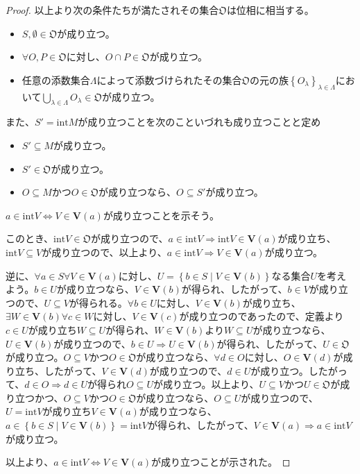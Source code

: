 \documentclass[dvipdfmx]{jsarticle}
\begin{document}
\begin{proof}
以上より次の条件たちが満たされその集合$\mathfrak{O}$は位相に相当する。
\begin{itemize}
\item
  $S,\emptyset \in \mathfrak{O}$が成り立つ。
\item
  $\forall O,P \in \mathfrak{O}$に対し、$O \cap P \in \mathfrak{O}$が成り立つ。
\item
  任意の添数集合$\varLambda$によって添数づけられたその集合$\mathfrak{O}$の元の族$\left\{ O_{\lambda} \right\}_{\lambda \in \varLambda}$において$\bigcup_{\lambda \in \varLambda} O_{\lambda}\in \mathfrak{O}$が成り立つ。
\end{itemize}\par
また、$S' = {\mathrm{int}}M$が成り立つことを次のこといづれも成り立つことと定め
\begin{itemize}
\item
  $S' \subseteq M$が成り立つ。
\item
  $S'\in \mathfrak{O}$が成り立つ。
\item
  $O \subseteq M$かつ$O \in \mathfrak{O}$が成り立つなら、$O \subseteq S'$が成り立つ。
\end{itemize}
$a \in {\mathrm{int}}V \Leftrightarrow V \in \mathbf{V}(a)$が成り立つことを示そう。\par
このとき、${\mathrm{int}}V\in \mathfrak{O}$が成り立つので、$a \in {\mathrm{int}}V \Rightarrow {\mathrm{int}}V \in \mathbf{V}(a)$が成り立ち、${\mathrm{int}}V \subseteq V$が成り立つので、以上より、$a \in {\mathrm{int}}V \Rightarrow V \in \mathbf{V}(a)$が成り立つ。\par
逆に、$\forall a \in S\forall V \in \mathbf{V}(a)$に対し、$U = \left\{ b \in S \middle| V \in \mathbf{V}(b) \right\}$なる集合$U$を考えよう。$b \in U$が成り立つなら、$V \in \mathbf{V}(b)$が得られ、したがって、$b \in V$が成り立つので、$U \subseteq V$が得られる。$\forall b \in U$に対し、$V \in \mathbf{V}(b)$が成り立ち、$\exists W \in \mathbf{V}(b)\forall c \in W$に対し、$V \in \mathbf{V}(c)$が成り立つのであったので、定義より$c \in U$が成り立ち$W \subseteq U$が得られ、$W \in \mathbf{V}(b)$より$W \subseteq U$が成り立つなら、$U \in \mathbf{V}(b)$が成り立つので、$b \in U \Rightarrow U \in \mathbf{V}(b)$が得られ、したがって、$U \in \mathfrak{O}$が成り立つ。$O \subseteq V$かつ$O \in \mathfrak{O}$が成り立つなら、$\forall d \in O$に対し、$O \in \mathbf{V}(d)$が成り立ち、したがって、$V \in \mathbf{V}(d)$が成り立つので、$d \in U$が成り立つ。したがって、$d \in O \Rightarrow d \in U$が得られ$O \subseteq U$が成り立つ。以上より、$U \subseteq V$かつ$U \in \mathfrak{O}$が成り立つかつ、$O \subseteq V$かつ$O \in \mathfrak{O}$が成り立つなら、$O \subseteq U$が成り立つので、$U = {\mathrm{int}}V$が成り立ち$V \in \mathbf{V}(a)$が成り立つなら、$a \in \left\{ b \in S \middle| V \in \mathbf{V}(b) \right\} = {\mathrm{int}}V$が得られ、したがって、$V \in \mathbf{V}(a) \Rightarrow a \in {\mathrm{int}}V$が成り立つ。\par
以上より、$a \in {\mathrm{int}}V \Leftrightarrow V \in \mathbf{V}(a)$が成り立つことが示された。
\end{proof}
\end{document}
